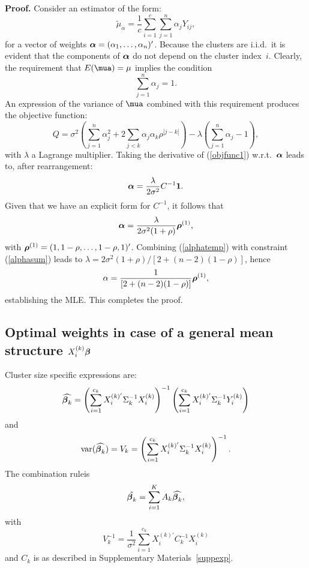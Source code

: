 \documentclass[11pt,a5paper,twoside]{book}
\newcommand{\bfbeta}{\mbox{\boldmath $\beta$}}
\newcommand{\bfalpha}{\mbox{\boldmath $\alpha$}}
\newcommand{\bfrho}{\mbox{\boldmath $\rho$}}
\newcommand{\eenvec}{\mbox{\boldmath $1$}}
\begin{document}
{{\bfseries Proof.} Consider an estimator of the form:
\begin{equation}
\widetilde{\mu}_\alpha=\frac{1}{c}\sum_{i=1}^c\sum_{j=1}^n\alpha_jY_{ij},
\end{equation}
for a vector of weights $\bfalpha=(\alpha_1,\dots,\alpha_n)'$. Because the clusters are i.i.d.\ it is evident that the components of $\bfalpha$ do not depend on the cluster index~$i$. Clearly, the requirement that $E(\mua)=\mu$ implies the condition
\begin{equation}
\label{alphasum}
\sum_{j=1}^n\alpha_j=1.
\end{equation}
 An expression of the variance of $\mua$ combined with this requirement produces the objective function:
\begin{equation}
\label{objfunc1}
Q=\sigma^2\left(
\sum_{j=1}^n\alpha_j^2+2\sum_{j<k}\alpha_j\alpha_k\rho^{|j-k|}
\right)
-\lambda\left(
\sum_{j=1}^n\alpha_j-1
\right),
\end{equation}
with $\lambda$ a Lagrange multiplier. Taking the derivative of (\ref{objfunc1}) w.r.t.\ $\bfalpha$ leads to, after rearrangement:
$$\bfalpha=\frac{\lambda}{2\sigma^2}C^{-1}\eenvec.$$
Given that we have an explicit form for $C^{-1}$, it follows that
\begin{equation}
\label{alphatemp}
\bfalpha=\frac{\lambda}{2\sigma^2(1+\rho)}\bfrho^{(1)},
\end{equation}
with $\bfrho^{(1)}=(1,1-\rho,\dots,1-\rho,1)'$.
Combining (\ref{alphatemp}) with constraint (\ref{alphasum}) leads to
$\lambda=2\sigma^2(1+\rho)/[2+(n-2)(1-\rho)]$, hence
$$\alpha=
\frac{1}{[2+(n-2)(1-\rho)]}\bfrho^{(1)},
$$
establishing the MLE. This completes the proof.

\subsection{Optimal weights in case of a general mean structure $X_i^{(k)}\bfbeta$}\label{suppgenmean}

Cluster size specific expressions are:
\begin{equation}
\widehat{\bfbeta_k}= \left( \sum_{i=1}^{c_k} X_{i}^{(k)'}\Sigma_k^{-1}X_{i}^{(k)}\right)^{-1} \left( \sum_{i=1}^{c_k} X_{i}^{(k)'}\Sigma_k^{-1}Y_{i}^{(k)}\right) \label{betagenmean}
\end{equation}
and
\begin{equation}
\mbox{var}(\widehat{\bfbeta_k})=V_k=\left( \sum_{i=1}^{c_k} X_{i}^{(k)'}\Sigma_k^{-1}X_{i}^{(k)}\right)^{-1}.
\end{equation}
The combination ruleis 
\begin{equation}
\tilde{\bfbeta_k}=\sum_{i=1}^K A_k \widehat{\bfbeta_k},
\end{equation}
with
\begin{equation}
V_k^{-1}=\frac{1}{\sigma^2}\sum_{i=1}^{c_k} X_{i}^{(k)'}C_k^{-1}X_{i}^{(k)}
\end{equation}
and $C_k$ is as described in Supplementary Materials~\ref{suppexp}.

}
\end{document}
